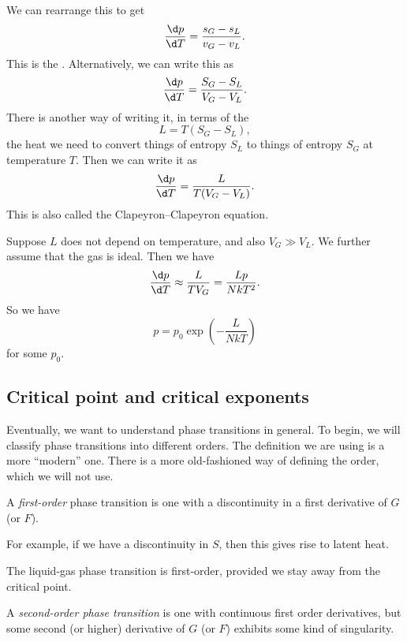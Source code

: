 \documentclass[a4paper]{article}
\begin{document}
We can rearrange this to get
\[
  \frac{\d p}{\d T} = \frac{s_G - s_L}{v_G - v_L}.
\]
This is the . Alternatively, we can write this as
\[
  \frac{\d p}{\d T} = \frac{S_G - S_L}{V_G - V_L}.
\]
There is another way of writing it, in terms of the 
\[
  L = T(S_G - S_L),
\]
the heat we need to convert things of entropy $S_L$ to things of entropy $S_G$ at temperature $T$. Then we can write it as
\[
  \frac{\d p}{\d T} = \frac{L}{T(V_G - V_L)}.
\]
This is also called the Clapeyron--Clapeyron equation.

\begin{eg}
  Suppose $L$ does not depend on temperature, and also $V_G \gg V_L$. We further assume that the gas is ideal. Then we have
  \[
    \frac{\d p}{\d T} \approx \frac{L}{T V_G} = \frac{L p}{ NkT^2}.
  \]
  So we have
  \[
    p = p_0 \exp \left(- \frac{L}{NkT}\right)
  \]
  for some $p_0$.
\end{eg}

\subsection{Critical point and critical exponents}
Eventually, we want to understand phase transitions in general. To begin, we will classify phase transitions into different orders. The definition we are using is a more ``modern'' one. There is a more old-fashioned way of defining the order, which we will not use.

\begin{defi}
  A \emph{first-order} phase transition is one with a discontinuity in a first derivative of $G$ (or $F$).
\end{defi}
For example, if we have a discontinuity in $S$, then this gives rise to latent heat.

\begin{eg}
  The liquid-gas phase transition is first-order, provided we stay away from the critical point.
\end{eg}

\begin{defi}
  A \emph{second-order phase transition} is one with continuous first order derivatives, but some second (or higher) derivative of $G$ (or $F$) exhibits some kind of singularity.
\end{defi}
\end{document}
